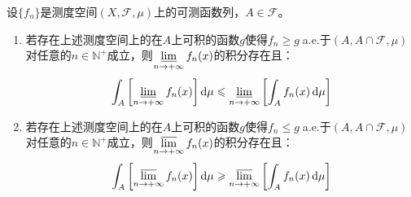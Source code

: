 \begin{corollary}\label{cor:FatouLemma}
	设$\{f_n\}$是测度空间$(X,\mathscr{F},\mu)$上的可测函数列，$A\in\mathscr{F}$。
	\begin{enumerate}
		\item 若存在上述测度空间上的在$A$上可积的函数$g$使得$f_n\geqslant g\;$a.e.于$(A,A\cap\mathscr{F},\mu)$对任意的$n\in\mathbb{N}^+$成立，则$\varliminf\limits_{n\to+\infty}f_n(x)$的积分存在且：
		\begin{equation*}
			\int_{A}\left[\varliminf_{n\to+\infty}f_n(x)\right]\mathop{}\!\mathrm{d}\mu\leqslant\varliminf_{n\to+\infty}\left[\int_{A}f_n(x)\mathop{}\!\mathrm{d}\mu\right]
		\end{equation*}
		\item 若存在上述测度空间上的在$A$上可积的函数$g$使得$f_n\leqslant g\;$a.e.于$(A,A\cap\mathscr{F},\mu)$对任意的$n\in\mathbb{N}^+$成立，则$\varlimsup\limits_{n\to+\infty}f_n(x)$的积分存在且：
		\begin{equation*}
			\int_{A}\left[\varlimsup_{n\to+\infty}f_n(x)\right]\mathop{}\!\mathrm{d}\mu\geqslant\varlimsup_{n\to+\infty}\left[\int_{A}f_n(x)\mathop{}\!\mathrm{d}\mu\right]
		\end{equation*}
	\end{enumerate}
\end{corollary}
